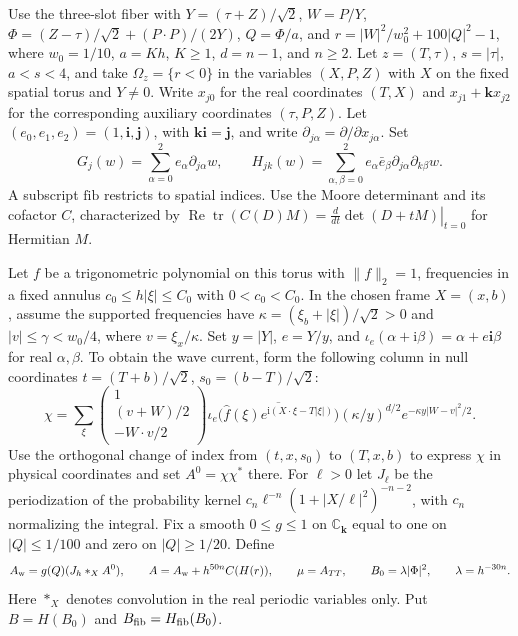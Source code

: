 Use the three-slot fiber with $Y=(\tau+Z)/\sqrt 2$, $W=P/Y$, $\Phi=(Z-\tau)/\sqrt 2+(P\cdot P)/(2Y)$, $Q=\Phi/a$, and $r=|W|^2/w_0^2+100|Q|^2-1$, where $w_0=1/10$, $a=Kh$, $K\ge1$, $d=n-1$, and $n\ge2$. Let $z=(T,\tau)$, $s=|\tau|$, $a<s<4$, and take $\Omega_z=\{r<0\}$ in the variables $(X,P,Z)$ with $X$ on the fixed spatial torus and $Y\ne0$. Write $x_{j0}$ for the real coordinates $(T,X)$ and $x_{j1}+\mathbf kx_{j2}$ for the corresponding auxiliary coordinates $(\tau,P,Z)$. Let $(e_0,e_1,e_2)=(1,\mathbf i,\mathbf j)$, with $\mathbf k\mathbf i=\mathbf j$, and write $\partial_{j\alpha}=\partial/\partial x_{j\alpha}$. Set
\[
 G_j(w)=\sum_{\alpha=0}^2 e_\alpha\partial_{j\alpha}w,\qquad
 H_{jk}(w)=\sum_{\alpha,\beta=0}^2 e_\alpha\bar e_\beta\partial_{j\alpha}\partial_{k\beta}w .
\]
A subscript $\mathrm{fib}$ restricts to spatial indices. Use the Moore determinant and its cofactor $C$, characterized by
$\operatorname{Re}\operatorname{tr}(C(D)M)=\left.\frac{d}{dt}\det(D+tM)\right|_{t=0}$
for Hermitian $M$.

Let $f$ be a trigonometric polynomial on this torus with $\|f\|_2=1$, frequencies in a fixed annulus $c_0\le h|\xi|\le C_0$ with $0<c_0<C_0$. In the chosen frame $X=(x,b)$, assume the supported frequencies have $\kappa=(\xi_b+|\xi|)/\sqrt2>0$ and $|v|\le\gamma<w_0/4$, where $v=\xi_x/\kappa$. Set $y=|Y|$, $e=Y/y$, and $\iota_e(\alpha+\mathrm i\beta)=\alpha+e\mathbf i\beta$ for real $\alpha,\beta$. To obtain the wave current, form the following column in null coordinates $t=(T+b)/\sqrt2$, $s_0=(b-T)/\sqrt2$:
\[
 \chi=\sum_{\xi}
 \begin{pmatrix}1\\(v+W)/2\\-W\cdot v/2\end{pmatrix}
 \iota_e\!\bigl(\overline{\widehat f(\xi)e^{\mathrm i(X\cdot\xi-T|\xi|)}}\bigr)
 (\kappa/y)^{d/2}e^{-\kappa y|W-v|^2/2}.
\]
Use the orthogonal change of index from $(t,x,s_0)$ to $(T,x,b)$ to express $\chi$ in physical coordinates and set $A^0=\chi\chi^*$ there. For $\ell>0$ let $J_\ell$ be the periodization of the probability kernel $c_n\ell^{-n}(1+|X/\ell|^2)^{-n-2}$, with $c_n$ normalizing the integral. Fix a smooth $0\le g\le1$ on $\mathbb C_{\mathbf k}$ equal to one on $|Q|\le1/100$ and zero on $|Q|\ge1/20$. Define
\[
 A_{\rm w}=g(Q)(J_h*_X A^0),\qquad A=A_{\rm w}+h^{50n}C(H(r)),\qquad
 \mu=A_{TT},\qquad B_0=\lambda|\Phi|^2,\qquad\lambda=h^{-30n}.
\]
Here $*_X$ denotes convolution in the real periodic variables only. Put $B=H(B_0)$ and $B_{\rm fib}=H_{\rm fib}(B_0)$.

